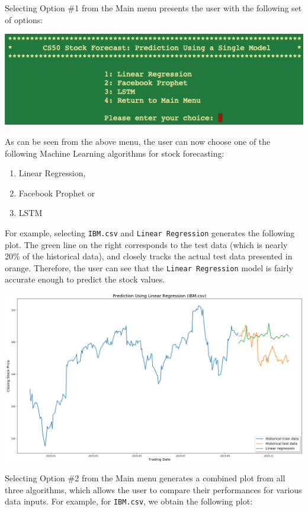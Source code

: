 \documentclass[12pt, oneside]{article}   	%
\begin{document}
\noindent
Selecting Option \#1 from the Main menu presents the user with the following set of options:\\


\centerline{\includegraphics[width=6in]{3.png}}

\vspace*{0.2in}
\noindent
As can be seen from the above menu,  the user can now choose one of the following Machine Learning algorithms for stock forecasting:
\begin{enumerate}
\item Linear Regression,
\item Facebook Prophet or 
\item LSTM
\end{enumerate}
For example, selecting {\tt IBM.csv} and {\tt Linear Regression} generates the following plot.  The green line on the right corresponds to the test data (which is nearly 20\% of the historical data), and closely tracks the actual test data presented in orange. Therefore, the user can see that the {\tt Linear Regression} model is fairly accurate enough to predict the stock values.\\

\centerline{\includegraphics[width=6in]{LR.png}}

\noindent
Selecting Option \#2 from the Main menu generates a combined plot from all three algorithms, which allows the user to compare their performances for various data inputs. For example,  for {\tt IBM.csv}, we obtain the following plot:
\end{document}
